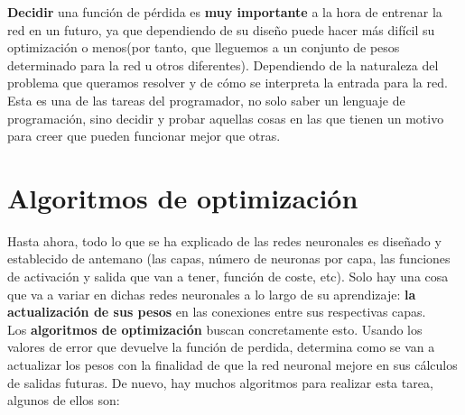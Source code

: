 \documentclass[11pt,fleqn]{book} %
\begin{document}
\textbf{Decidir} una función de pérdida es \textbf{muy importante} a la hora de entrenar la red en un futuro, ya que dependiendo de su diseño puede hacer más difícil su optimización o menos(por tanto, que lleguemos a un conjunto de pesos determinado para la red u otros diferentes). Dependiendo de la naturaleza del problema que queramos resolver y de cómo se interpreta la entrada para la red. \\

Esta es una de las tareas del programador, no solo saber un lenguaje de programación, sino decidir y probar aquellas cosas en las que tienen un motivo para creer que pueden funcionar mejor que otras.

\section{Algoritmos de optimización}\label{sec:optimizacion}

Hasta ahora, todo lo que se ha explicado de las redes neuronales es diseñado y establecido de antemano (las capas, número de neuronas por capa, las funciones de activación y salida que van a tener, función de coste, etc). Solo hay una cosa que va a variar en dichas redes neuronales a lo largo de su aprendizaje: \textbf{la actualización de sus pesos} en las conexiones entre sus respectivas capas. \\

Los \textbf{algoritmos de optimización} buscan concretamente esto. Usando los valores de error que devuelve la función de perdida, determina como se van a actualizar los pesos con la finalidad de que la red neuronal mejore en sus cálculos de salidas futuras. De nuevo, hay muchos algoritmos para realizar esta tarea, algunos de ellos son: \\
\end{document}
